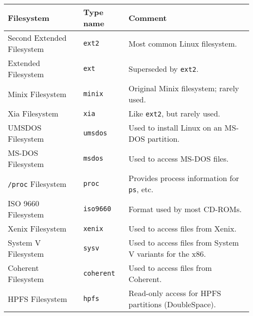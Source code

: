 {\newpage
\clearpage
\samepage \begin{table}[ht]\begin{center}
\small\begin{tabular}{lll}
\hline
Filesystem		& Type name 	& Comment \\ 
\hline
Second Extended Filesystem & {\tt ext2} & Most common Linux filesystem. \\ 
Extended Filesystem	& {\tt ext} 	& Superseded by {\tt ext2}.\\ 
Minix Filesystem 	& {\tt minix} 	& Original Minix filesystem; rarely used.\\ 
Xia Filesystem		& {\tt xia}	& Like {\tt ext2}, but rarely used.\\ 
UMSDOS Filesystem	& {\tt umsdos}	& Used to install Linux on an MS-DOS partition.\\ 
MS-DOS Filesystem	& {\tt msdos} 	& Used to access MS-DOS files. \\ 
{\tt /proc} Filesystem  & {\tt proc}	& Provides process information for {\tt ps}, etc.\\ 
ISO 9660 Filesystem	& {\tt iso9660} & Format used by most CD-ROMs.\\ 
Xenix Filesystem 	& {\tt xenix}	& Used to access files from Xenix.\\ 
System V Filesystem	& {\tt sysv}	& Used to access files from System V variants for the x86.\\ 
Coherent Filesystem	& {\tt coherent} & Used to access files from Coherent.\\ 
HPFS Filesystem		& {\tt hpfs} & Read-only access for HPFS partitions (DoubleSpace).\\ 
\end{tabular}\normalsize\rm

\label{table-fs-types}
\end{center}\end{table}
}

{\newpage
\clearpage
\samepage {}
}

{\newpage
\clearpage
\samepage {}
}

